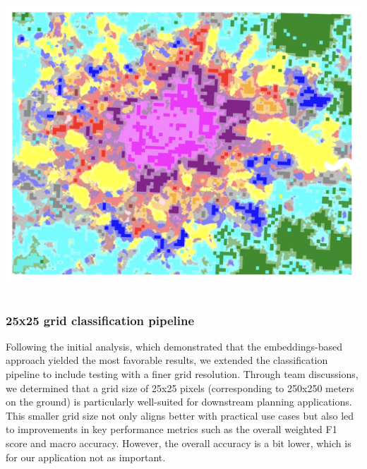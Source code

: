 \documentclass[
  letterpaper,
  DIV=11,
  numbers=noendperiod]{scrartcl}
\begin{document}
\begin{center}
\includegraphics[width=\linewidth,height=4.375in,keepaspectratio]{../figures/algo_design/results_eurofab.png}
\end{center}

\subsubsection{25x25 grid classification
pipeline}\label{x25-grid-classification-pipeline}

Following the initial analysis, which demonstrated that the
embeddings-based approach yielded the most favorable results, we
extended the classification pipeline to include testing with a finer
grid resolution. Through team discussions, we determined that a grid
size of 25x25 pixels (corresponding to 250x250 meters on the ground) is
particularly well-suited for downstream planning applications. This
smaller grid size not only aligns better with practical use cases but
also led to improvements in key performance metrics such as the overall
weighted F1 score and macro accuracy. However, the overall accuracy is a
bit lower, which is for our application not as important.
\end{document}
